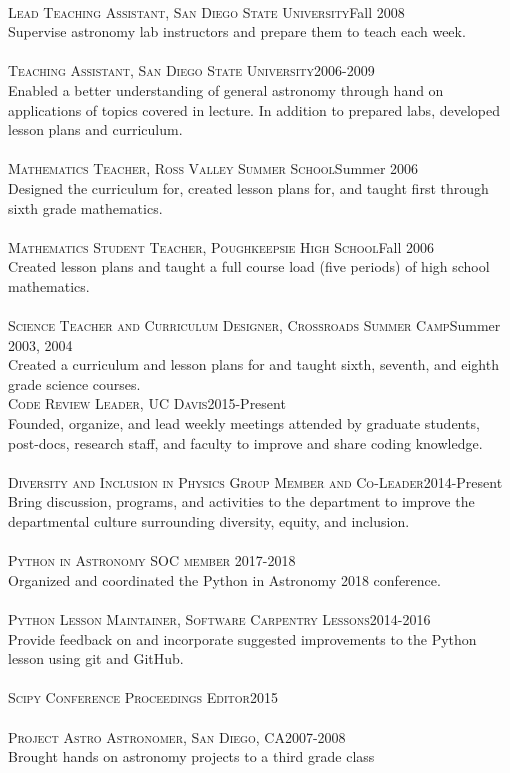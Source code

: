 \documentclass[10pt]{cv}
\begin{document}
\begin{llist}
\\
\textsc{Lead Teaching Assistant, San Diego State University}\hfill Fall 2008\\
Supervise astronomy lab instructors and prepare them to teach each week. \\
\\
\textsc{Teaching Assistant, San Diego State University}\hfill 2006-2009\\
Enabled a better understanding of general astronomy through hand on applications of topics covered in lecture. In addition to prepared labs, developed lesson plans and curriculum.\\
\\
\textsc{Mathematics Teacher, Ross Valley Summer School}\hfill Summer 2006\\
Designed the curriculum for, created lesson plans for, and taught first through sixth grade mathematics.\\
\\
\textsc{Mathematics Student Teacher, Poughkeepsie High School}\hfill Fall 2006\\
Created lesson plans and taught a full course load (five periods) of high school mathematics.\\
\\
\textsc{Science Teacher and Curriculum Designer, Crossroads Summer Camp}\hfill Summer 2003, 2004 \\
Created a curriculum and lesson plans for and taught sixth, seventh, and eighth grade science courses.\\
\textsc{Code Review Leader, UC Davis}\hfill 2015-Present\\
Founded, organize, and lead weekly meetings attended by graduate students, post-docs, research staff, and faculty to improve and share coding knowledge.\\
\\
\textsc{Diversity and Inclusion in Physics Group Member and Co-Leader}\hfill 2014-Present\\
Bring discussion, programs, and activities to the department to improve the departmental culture surrounding diversity, equity, and inclusion.\\
\\
\textsc{Python in Astronomy SOC member} \hfill 2017-2018\\
Organized and coordinated the Python in Astronomy 2018 conference.\\
\\
\textsc{Python Lesson Maintainer, Software Carpentry Lessons}\hfill 2014-2016\\
Provide feedback on and incorporate suggested improvements to the Python lesson using git and GitHub.\\
\\
\textsc{Scipy Conference Proceedings Editor}\hfill 2015\\
\\
\textsc{Project Astro Astronomer, San Diego, CA}\hfill 2007-2008\\
Brought hands on astronomy projects to a third grade class\\
\\
\end{llist}
\end{document}
